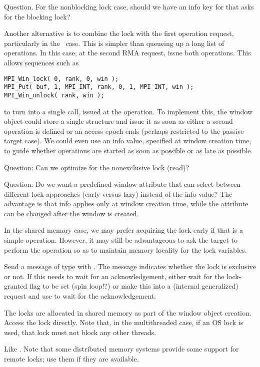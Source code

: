 \documentclass{article}
\begin{document}
Question.  For the nonblocking lock case, should we have an info key
for  that asks for the blocking lock?  

Another alternative is to combine the lock with the first operation
request, particularly in the \tcpname\ case.  This is simpler than
queueing up a long list of operations.  In this case, at the second
RMA request, issue both operations.  This allows sequences such as
\begin{verbatim}
MPI_Win_lock( 0, rank, 0, win );
MPI_Put( buf, 1, MPI_INT, rank, 0, 1, MPI_INT, win );
MPI_Win_unlock( rank, win );
\end{verbatim}
to turn into a single  call, issued at the
 operation.  To implement this, the window
object could store a single  structure and
issue it as soon as either a second operation is defined or an access
epoch ends (perhaps restricted to the passive target case).  We could
even use an info value, specified at window creation time, to guide
whether operations are started as soon as possible or as late as possible.

Question: Can we optimize for the nonexclusive lock (read)?  

Question: Do we want a predefined window attribute that can select between
different lock approaches (early versus lazy) instead of the info value?
The advantage is that info applies only at window creation time, while the
attribute can be changed after the window is created.

In the shared memory case, we may prefer acquiring the lock early if that is a
simple operation.  However, it may still be advantageous to ask the target to
perform the operation so as to maintain memory locality for the lock
variables.

\begin{tcp}
Send a message of type  with
.  The message indicates whether the lock is
exclusive or not.  If this needs to wait for an acknowledgement,
either wait for the lock-granted flag to be set (spin loop!?) or make
this into a (internal generalized) request and use
 to wait for the acknowledgement.
\end{tcp}
\begin{shmem}
The locks are allocated in shared memory as part of the window object
creation.  Access the lock directly.  Note that, in the multithreaded
case, if an OS lock is used, that lock must not block any other threads.
\end{shmem}
\begin{via}
Like \tcpname.  Note that some distributed memory systems provide some
support for remote locks; use them if they are available.
\end{via}
\end{document}
